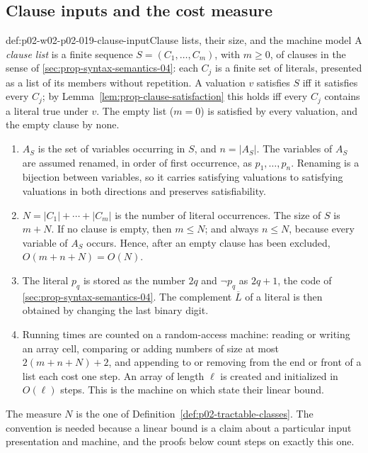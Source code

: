 \subsection{Clause inputs and the cost measure}
\label{sec:p02-w02-p02-019-inputs}

\begin{hbconvention}{def:p02-w02-p02-019-clause-input}{Clause lists, their size, and the machine model}
A \emph{clause list} is a finite sequence \(S=(C_1,\ldots,C_m)\), with
\(m\geq 0\), of clauses in the sense of
\cref{sec:prop-syntax-semantics-04}: each \(C_j\) is a finite set of literals,
presented as a list of its members without repetition.  A valuation \(v\)
satisfies \(S\) iff it satisfies every \(C_j\); by
Lemma~\ref{lem:prop-clause-satisfaction} this holds iff every \(C_j\) contains
a literal true under \(v\).  The empty list (\(m=0\)) is satisfied by every
valuation, and the empty clause by none.
\begin{enumerate}
  \item \(A_S\) is the set of variables occurring in \(S\), and \(n=|A_S|\).
        The variables of \(A_S\) are assumed renamed, in order of first
        occurrence, as \(p_1,\ldots,p_n\).  Renaming is a bijection between
        variables, so it carries satisfying valuations to satisfying
        valuations in both directions and preserves satisfiability.
  \item \(N=|C_1|+\cdots+|C_m|\) is the number of literal occurrences.  The
        size of \(S\) is \(m+N\).  If no clause is empty, then \(m\leq N\);
        and always \(n\leq N\), because every variable of \(A_S\) occurs.
        Hence, after an empty clause has been excluded, \(O(m+n+N)=O(N)\).
  \item The literal \(p_q\) is stored as the number \(2q\) and \(\neg p_q\) as
        \(2q+1\), the code of \cref{sec:prop-syntax-semantics-04}.  The
        complement \(\overline L\) of a literal is then obtained by changing
        the last binary digit.
  \item Running times are counted on a random-access machine: reading or
        writing an array cell, comparing or adding numbers of size at most
        \(2(m+n+N)+2\), and appending to or removing from the end or front of
        a list each cost one step.  An array of length \(\ell\) is created and
        initialized in \(O(\ell)\) steps.  This is the machine on which
        \textcite[121]{AspvallPlassTarjan1979} state their linear bound.
\end{enumerate}
The measure \(N\) is the one of Definition~\ref{def:p02-tractable-classes}.
The convention is needed because a linear bound is a claim about a particular
input presentation and machine, and the proofs below count steps on exactly
this one.
\end{hbconvention}

